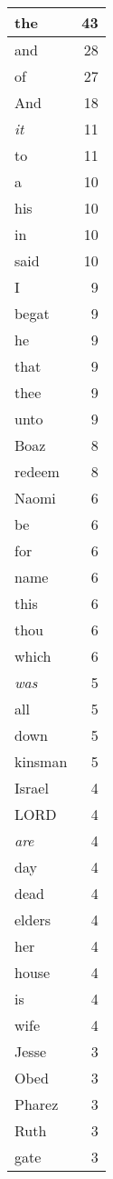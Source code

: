 \begin{center}
\begin{longtable}{l|r}
\hline \hline
\endlastfoot
the & 43 \\ \hline
and & 28 \\ \hline
of & 27 \\ \hline
And & 18 \\ \hline
\emph{it} & 11 \\ \hline
to & 11 \\ \hline
a & 10 \\ \hline
his & 10 \\ \hline
in & 10 \\ \hline
said & 10 \\ \hline
I & 9 \\ \hline
begat & 9 \\ \hline
he & 9 \\ \hline
that & 9 \\ \hline
thee & 9 \\ \hline
unto & 9 \\ \hline
Boaz & 8 \\ \hline
redeem & 8 \\ \hline
Naomi & 6 \\ \hline
be & 6 \\ \hline
for & 6 \\ \hline
name & 6 \\ \hline
this & 6 \\ \hline
thou & 6 \\ \hline
which & 6 \\ \hline
\emph{was} & 5 \\ \hline
all & 5 \\ \hline
down & 5 \\ \hline
kinsman & 5 \\ \hline
Israel & 4 \\ \hline
LORD & 4 \\ \hline
\emph{are} & 4 \\ \hline
day & 4 \\ \hline
dead & 4 \\ \hline
elders & 4 \\ \hline
her & 4 \\ \hline
house & 4 \\ \hline
is & 4 \\ \hline
wife & 4 \\ \hline
Jesse & 3 \\ \hline
Obed & 3 \\ \hline
Pharez & 3 \\ \hline
Ruth & 3 \\ \hline
gate & 3 \\ \hline

\end{longtable}
\end{center}
